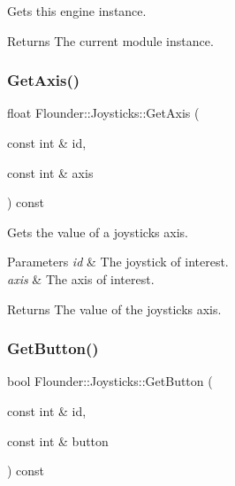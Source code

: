 Gets this engine instance. 

\begin{DoxyReturn}{Returns}
The current module instance. 
\end{DoxyReturn}
\mbox{\label{class_flounder_1_1_joysticks_a2bd889734e023551f79125c138830236}} 
\subsubsection{\texorpdfstring{Get\+Axis()}{GetAxis()}}
{\footnotesize\ttfamily float Flounder\+::\+Joysticks\+::\+Get\+Axis (\begin{DoxyParamCaption}\item[{const int \&}]{id,  }\item[{const int \&}]{axis }\end{DoxyParamCaption}) const}



Gets the value of a joysticks axis. 


\begin{DoxyParams}{Parameters}
{\em id} & The joystick of interest. \\
\hline
{\em axis} & The axis of interest. \\
\hline
\end{DoxyParams}
\begin{DoxyReturn}{Returns}
The value of the joystick\textquotesingle{}s axis. 
\end{DoxyReturn}
\mbox{\label{class_flounder_1_1_joysticks_a22824221cb88733feec994c875c09a30}} 
\subsubsection{\texorpdfstring{Get\+Button()}{GetButton()}}
{\footnotesize\ttfamily bool Flounder\+::\+Joysticks\+::\+Get\+Button (\begin{DoxyParamCaption}\item[{const int \&}]{id,  }\item[{const int \&}]{button }\end{DoxyParamCaption}) const}




